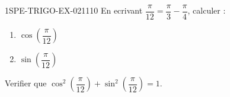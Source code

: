 \begin{exercice}{1SPE-TRIGO-EX-021}{1}{10}
En ecrivant $\dfrac{\pi}{12} = \dfrac{\pi}{3} - \dfrac{\pi}{4}$, calculer :
\begin{enumerate}
  \item $\cos\!\left(\dfrac{\pi}{12}\right)$
  \item $\sin\!\left(\dfrac{\pi}{12}\right)$
\end{enumerate}
Verifier que $\cos^2\!\left(\dfrac{\pi}{12}\right) + \sin^2\!\left(\dfrac{\pi}{12}\right) = 1$.
\end{exercice}
